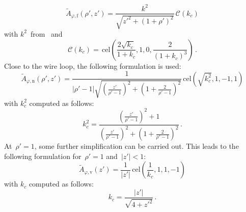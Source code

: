 \begin{equation}
  \tilde{A}_{\varphi,\mathrm{f}} (\rho',z')
  = \frac{k^2}{\sqrt{z'^2 + (1 + \rho')^2}} \,\mathcal{C}(k_c) \label{eqn:cwl_A_phi_f}
\end{equation}
with $k^2$~from~ and
\begin{equation}
  \mathcal{C}(k_c)
  = \,\mathrm{cel} \left( \frac{2 \sqrt{k_c}}{1 + k_c}, 1, 0, \frac{2}{(1 + k_c)^3} \right) \, . \label{eqn:elliptic_c}
\end{equation}
Close to the wire loop, the following formulation is used:
\begin{equation}
  \tilde{A}_{\varphi,\mathrm{n}} (\rho',z')
  = \frac{1}{|\rho' - 1| \sqrt{\left( \frac{z'}{\rho'-1} \right)^2 + \left(1 + \frac{2}{\rho'-1} \right)^2 }}
    \,\mathrm{cel}(\sqrt{k_c^2}, 1, -1, 1) \label{eqn:cwl_A_phi_n}
\end{equation}
with $k_c^2$ computed as follows:
\begin{equation}
  k_c^2 = \frac{\left( \frac{z'}{\rho'-1} \right)^2 + 1}{\left( \frac{z'}{\rho'-1} \right)^2 + \left(1 + \frac{2}{\rho'-1} \right)^2} \, .
\end{equation}
At~$\rho' = 1$, some further simplification can be carried out.
This leads to the following formulation for~$\rho' = 1$ and~$|z'| < 1$:
\begin{equation}
  \tilde{A}_{\varphi,\mathrm{v}} (z') = \frac{1}{|z'|} \,\mathrm{cel}\left(\frac{1}{k_c}, 1, 1, -1\right) \label{eqn:cwl_A_phi_v}
\end{equation}
with $k_c$ computed as follows:
\begin{equation}
  k_c = \frac{|z'|}{\sqrt{4 + {z'}^2}} \, .
\end{equation}

